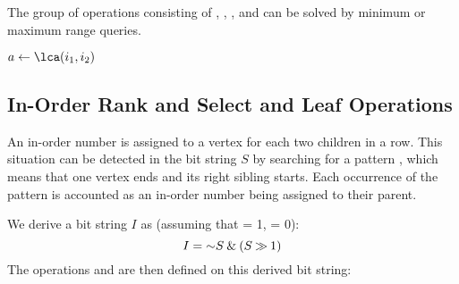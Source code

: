 The group of operations consisting of \lca{}, \distance{}, \deepestVertex{}, and \hei{} can be solved by minimum or maximum range queries.

\begin{algorithm}
\begin{algorithmic}
		\State {}
		\State {}
	\Else
		\State {}
	\EndIf
\EndFunction
\end{algorithmic}
\end{algorithm}

\begin{algorithm}
\begin{algorithmic}
	\State $a \gets \lca(i_1, i_2)$
	\State {}
\EndFunction
\end{algorithmic}
\end{algorithm}

\begin{algorithm}
\begin{algorithmic}
	\State {}
\EndFunction
\end{algorithmic}
\end{algorithm}

\begin{algorithm}
\begin{algorithmic}
	\State {}
\EndFunction
\end{algorithmic}
\end{algorithm}

\subsection{In-Order Rank and Select and Leaf Operations}

An in-order number is assigned to a vertex for each two children in a row.
This situation can be detected in the bit string $S$ by searching for a pattern \str{)(}, which means that one vertex ends and its right sibling starts.
Each occurrence of the pattern is accounted as an in-order number being assigned to their parent.

We derive a bit string $I$ as (assuming that \openingParen = 1, \closingParen = 0):
$$ I = \mathord{\sim} S \mathbin{\&} (S \mathbin{\gg} 1) $$
The operations \inRank{} and \inSelect{} are then defined on this derived bit string:

